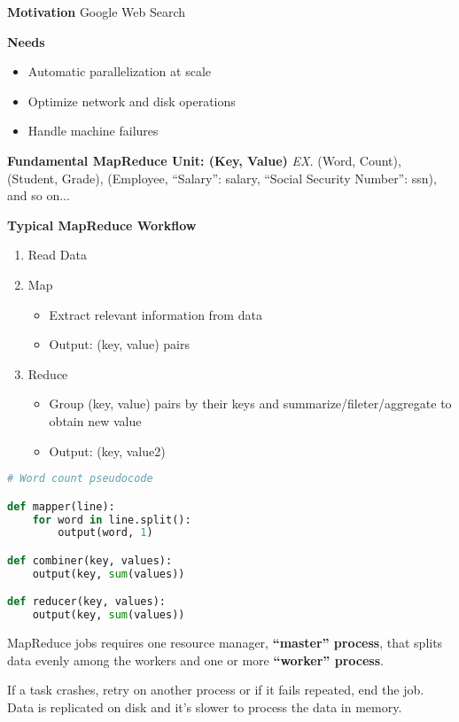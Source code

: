 \documentclass{article}
\begin{document}
\textbf{Motivation} Google Web Search

\textbf{Needs}

\begin{itemize}
    \item Automatic parallelization at scale
    \item Optimize network and disk operations
    \item Handle machine failures
\end{itemize} 

\textbf{Fundamental MapReduce Unit: (Key, Value)}
\textit{EX.} (Word, Count), (Student, Grade), (Employee, {``Salary'': salary, ``Social Security Number'': ssn}), and so on...

\textbf{Typical MapReduce Workflow}
\begin{enumerate}
    \item Read Data
    \item Map
    \begin{itemize}
        \item Extract relevant information from data
        \item Output: (key, value) pairs
    \end{itemize}
    \item Reduce
    \begin{itemize}
        \item Group (key, value) pairs by their keys and summarize/fileter/aggregate to obtain new value
        \item Output: (key, value2)
    \end{itemize}
\end{enumerate}

\begin{lstlisting}[language=Python]
# Word count pseudocode

def mapper(line):
    for word in line.split():
        output(word, 1)

def combiner(key, values):
    output(key, sum(values))

def reducer(key, values):
    output(key, sum(values))
\end{lstlisting}

MapReduce jobs requires one resource manager, \textbf{``master'' process}, that splits data evenly among the workers and one or more \textbf{``worker'' process}.

If a task crashes, retry on another process or if it fails repeated, end the job. Data is replicated on disk and it's slower to process the data in memory.
\end{document}
